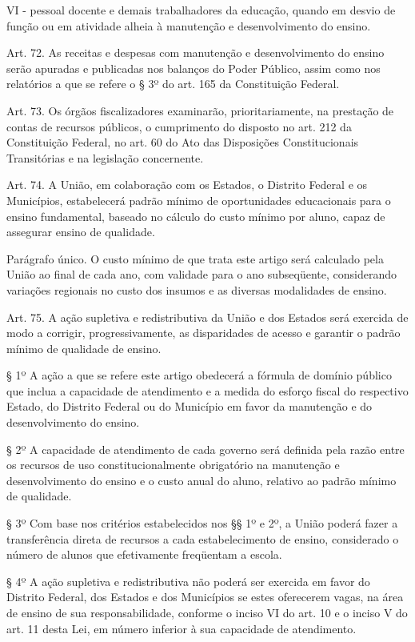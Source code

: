 \documentclass[
]{book}
\begin{document}
VI - pessoal docente e demais trabalhadores da educação, quando em desvio de função ou em atividade alheia à manutenção e desenvolvimento do ensino.

Art. 72. As receitas e despesas com manutenção e desenvolvimento do ensino serão apuradas e publicadas nos balanços do Poder Público, assim como nos relatórios a que se refere o § 3º do art. 165 da Constituição Federal.

Art. 73. Os órgãos fiscalizadores examinarão, prioritariamente, na prestação de contas de recursos públicos, o cumprimento do disposto no art. 212 da Constituição Federal, no art. 60 do Ato das Disposições Constitucionais Transitórias e na legislação concernente.

Art. 74. A União, em colaboração com os Estados, o Distrito Federal e os Municípios, estabelecerá padrão mínimo de oportunidades educacionais para o ensino fundamental, baseado no cálculo do custo mínimo por aluno, capaz de assegurar ensino de qualidade.

Parágrafo único. O custo mínimo de que trata este artigo será calculado pela União ao final de cada ano, com validade para o ano subseqüente, considerando variações regionais no custo dos insumos e as diversas modalidades de ensino.

Art. 75. A ação supletiva e redistributiva da União e dos Estados será exercida de modo a corrigir, progressivamente, as disparidades de acesso e garantir o padrão mínimo de qualidade de ensino.

§ 1º A ação a que se refere este artigo obedecerá a fórmula de domínio público que inclua a capacidade de atendimento e a medida do esforço fiscal do respectivo Estado, do Distrito Federal ou do Município em favor da manutenção e do desenvolvimento do ensino.

§ 2º A capacidade de atendimento de cada governo será definida pela razão entre os recursos de uso constitucionalmente obrigatório na manutenção e desenvolvimento do ensino e o custo anual do aluno, relativo ao padrão mínimo de qualidade.

§ 3º Com base nos critérios estabelecidos nos §§ 1º e 2º, a União poderá fazer a transferência direta de recursos a cada estabelecimento de ensino, considerado o número de alunos que efetivamente freqüentam a escola.

§ 4º A ação supletiva e redistributiva não poderá ser exercida em favor do Distrito Federal, dos Estados e dos Municípios se estes oferecerem vagas, na área de ensino de sua responsabilidade, conforme o inciso VI do art. 10 e o inciso V do art. 11 desta Lei, em número inferior à sua capacidade de atendimento.
\end{document}
